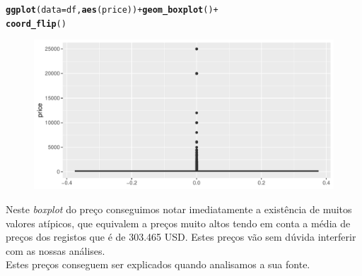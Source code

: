 \documentclass[justified, 11pt]{scrartcl}\usepackage[]{graphicx}\usepackage[]{xcolor}
\makeatletter
\def\maxwidth{ %
  \ifdim\Gin@nat@width>\linewidth
    \linewidth
  \else
    \Gin@nat@width
  \fi
}
\newcommand{\hlopt}[1]{\textcolor[rgb]{0,0,0}{#1}}%
\newcommand{\hlstd}[1]{\textcolor[rgb]{0.345,0.345,0.345}{#1}}%
\newcommand{\hlkwc}[1]{\textcolor[rgb]{0.333,0.667,0.333}{#1}}%
\newcommand{\hlkwd}[1]{\textcolor[rgb]{0.737,0.353,0.396}{\textbf{#1}}}%
\newenvironment{kframe}{%
 \def\at@end@of@kframe{}%
 \ifinner\ifhmode%
  \def\at@end@of@kframe{\end{minipage}}%
  \begin{minipage}{\columnwidth}%
 \fi\fi%
 \def\FrameCommand##1{\hskip\@totalleftmargin \hskip-\fboxsep
 \colorbox{shadecolor}{##1}\hskip-\fboxsep
     \hskip-\linewidth \hskip-\@totalleftmargin \hskip\columnwidth}%
 \MakeFramed {\advance\hsize-\width
   \@totalleftmargin\z@ \linewidth\hsize
   \@setminipage}}%
 {\par\unskip\endMakeFramed%
 \at@end@of@kframe}
\newenvironment{knitrout}{}{} %
\makeatother
\begin{document}
\begin{knitrout}
\color{fgcolor}\begin{kframe}
\begin{alltt}
\hlkwd{ggplot}\hlstd{(}\hlkwc{data} \hlstd{= df,} \hlkwd{aes}\hlstd{(price))} \hlopt{+} \hlkwd{geom_boxplot}\hlstd{()} \hlopt{+}
  \hlkwd{coord_flip}\hlstd{()}
\end{alltt}
\end{kframe}\begin{figure}
\includegraphics[width=\maxwidth]{figure/chunk-priceBoxPlot-1} \end{figure}

\end{knitrout}
Neste \textit{boxplot} do preço conseguimos notar imediatamente a existência de muitos valores atípicos, que equivalem a preços muito altos tendo em conta a média de preços dos registos que é de 303.465 USD. Estes preços vão sem dúvida interferir com as nossas análises. \\
Estes preços conseguem ser explicados quando analisamos a sua fonte.
\end{document}
